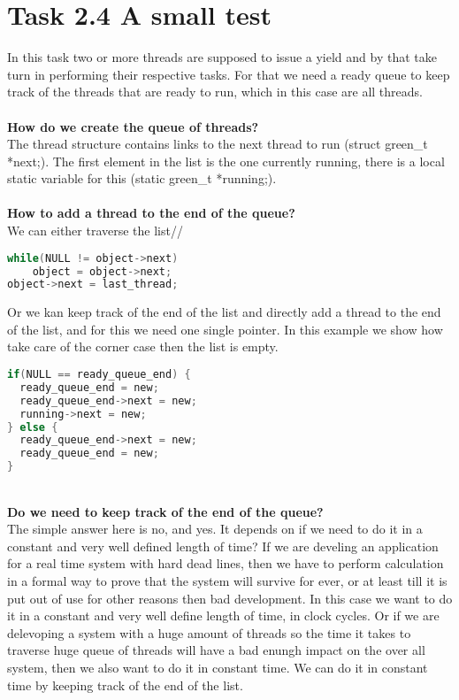 \documentclass[10pt,a4paper]{article}
\begin{document}
\section*{Task 2.4 A small test}
In this task two or more threads are supposed to issue a yield and by that take turn in performing their respective tasks. For that we need a ready queue to keep track of the threads that are ready to run, which in this case are all threads.\\
\\
\textbf{How do we create the queue of threads?}\\
The thread structure contains links to the next thread to run (struct green_t *next;). The first element in the list is the one currently running, there is a local static variable for this (static green_t *running;).\\
\\
\textbf{How to add a thread to the end of the queue?}\\
We can either traverse the list//
\begin{lstlisting}[language=C]
while(NULL != object->next)
	object = object->next;
object->next = last_thread;
\end{lstlisting}
Or we kan keep track of the end of the list and directly add a thread to the end of the list, and for this we need one single pointer. In this example we show how take care of the corner case then the list is empty.
\begin{lstlisting}[language=C]
if(NULL == ready_queue_end) {
  ready_queue_end = new;
  ready_queue_end->next = new;
  running->next = new;
} else {
  ready_queue_end->next = new;
  ready_queue_end = new;
}
\end{lstlisting}
\\
\textbf{Do we need to keep track of the end of the queue?}\\
The simple answer here is no, and yes. It depends on if we need to do it in a constant and very well defined length of time? If we are develing an application for a real time system with hard dead lines, then we have to perform calculation in a formal way to prove that the system will survive for ever, or at least till it is put out of use for other reasons then bad development. In this case we want to do it in a constant and very well define length of time, in clock cycles. Or if we are delevoping a system with a huge amount of threads so the time it takes to traverse huge queue of threads will have a bad enungh impact on the over all system, then we also want to do it in constant time. We can do it in constant time by keeping track of the end of the list.\\
\end{document}
